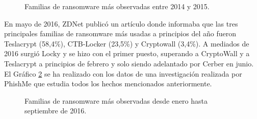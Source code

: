 \begin{figure}[h!]
\begin{center}
{}
\end{center}
\caption{Familias de ransomware más observadas entre 2014 y 2015.}
\label{fig:imkap}
\end{figure}%

En mayo de 2016, ZDNet publicó un artículo \cite{57} donde informaba que las tres principales familias de ransomware más usadas a principios del año fueron Teslacrypt (58,4\%), CTB-Locker (23,5\%) y Cryptowall (3,4\%). A mediados de 2016 surgió Locky y se hizo con el primer puesto, superando a CryptoWall y a Teslacrypt a principios de febrero y solo siendo adelantado por Cerber en junio. El Gráfico \ref{fig:imphish} se ha realizado con los datos de una investigación realizada por PhishMe \cite{6} que estudia todos los hechos mencionados anteriormente.

\begin{figure}[h!]
\begin{center}
{}
\end{center}
\caption{Familias de ransomware más observadas desde enero hasta septiembre de 2016.}
\label{fig:imphish}
\end{figure}%

